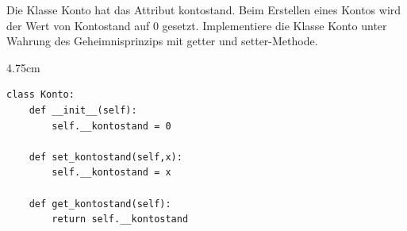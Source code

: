 \question[3]
Die Klasse Konto hat das Attribut kontostand. Beim Erstellen
eines Kontos wird der Wert von Kontostand auf 0 gesetzt. Implementiere die Klasse
Konto unter Wahrung des Geheimnisprinzips mit getter und setter-Methode.

\begin{solutionbox}{4.75cm}
\begin{lstlisting}
class Konto:
    def __init__(self):
        self.__kontostand = 0

    def set_kontostand(self,x):
        self.__kontostand = x

    def get_kontostand(self):
        return self.__kontostand
\end{lstlisting}
\end{solutionbox}

